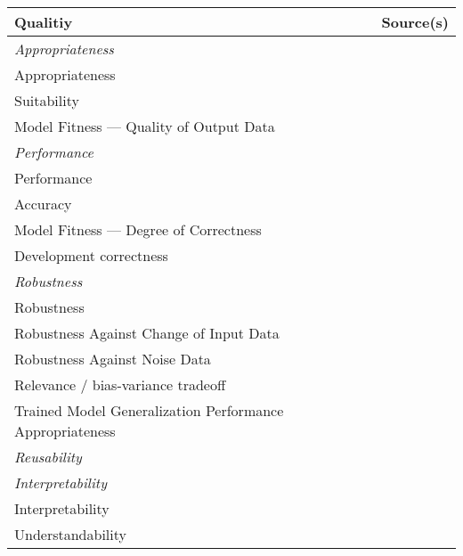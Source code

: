 \begin{table}[h]\label{tb:LiteratureQualitiesModel}
    \centering\scriptsize
    \begin{tabular}{p{} p{}}
        \textbf{Qualitiy} & \textbf{Source(s)} \\
        \toprule
        \textit{Appropriateness} \\
        Appropriateness &~\cite{siebert_construction_2021} \\
        Suitability &~\cite{siebert_construction_2021} \\
        Model Fitness --- Quality of Output Data &~\cite{nakamichi_requirements-driven_2020} \\
        \midrule
        \textit{Performance} \\
        Performance &~\cite{ashmore_assuring_2021,vogelsang_requirements_2019} \\
        Accuracy &~\cite{nakamichi_requirements-driven_2020} \\
        Model Fitness --- Degree of Correctness &~\cite{nakamichi_requirements-driven_2020,
                                                    zhang_machine_2020} \\
        Development correctness &~\cite{siebert_construction_2021} \\
        \midrule
        \textit{Robustness} \\
        Robustness &~\cite{ashmore_assuring_2021, hu_towards_2020, siebert_construction_2021} \\
        Robustness Against Change of Input Data &~\cite{nakamichi_requirements-driven_2020} \\
        Robustness Against Noise Data &~\cite{nakamichi_requirements-driven_2020} \\
        Relevance / bias-variance tradeoff &~\cite{siebert_construction_2021, zhang_machine_2020} \\
        Trained Model Generalization Performance Appropriateness
                                                    &~\cite{nakamichi_requirements-driven_2020} \\
        \midrule
        \textit{Reusability} &~\cite{ashmore_assuring_2021} \\
        \midrule
        \textit{Interpretability} \\
        Interpretability &~\cite{ashmore_assuring_2021, siebert_construction_2021, zhang_machine_2020}\\
        Understandability &~\cite{nakamichi_requirements-driven_2020} \\

\end{tabular}
\end{table}

